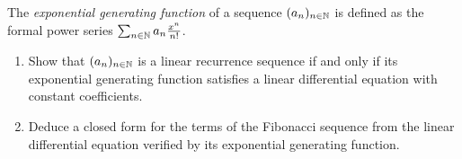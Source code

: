 \begin{exercise}
    The \emph{exponential generating function} of a sequence
    $(a_n)_{n \in \mathbb N}$ is defined as the formal power series $\sum_{n
    \in \mathbb N} a_n \frac{x^n}{n!}$.
    \begin{enumerate}
        \item Show that $(a_n)_{n \in \mathbb N}$ is a linear recurrence sequence
            if and only if its exponential generating function satisfies a
            linear differential equation with constant coefficients.
        \item Deduce a closed form for the terms of the Fibonacci
            sequence from the linear differential equation verified
            by its exponential generating function.
    \end{enumerate}
\end{exercise}
